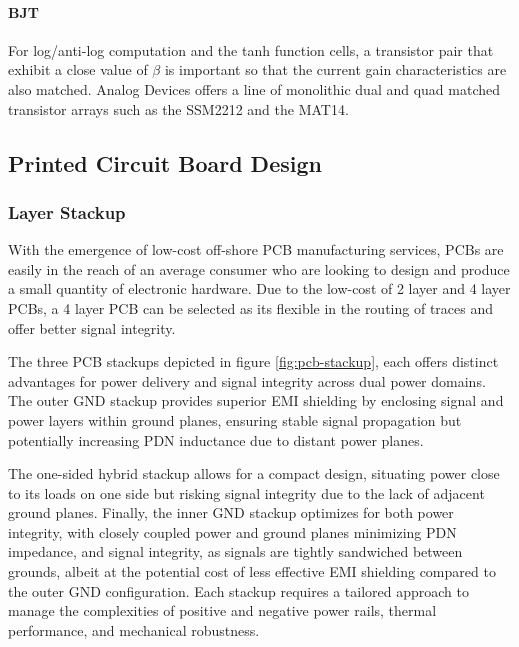 \documentclass[10pt]{article}
\begin{document}
\begin{multicols*}{2}
                \paragraph{BJT}
                    For log/anti-log computation and the tanh function cells, a transistor pair that exhibit a close value of $\beta$ is important so that the current gain characteristics are also matched. Analog Devices offers a line of monolithic dual and quad matched transistor arrays such as the SSM2212 and the MAT14.

            

            \subsection{Printed Circuit Board Design}

                \subsubsection{Layer Stackup}
                    With the emergence of low-cost off-shore PCB manufacturing services, PCBs are easily in the reach of an average consumer who are looking to design and produce a small quantity of electronic hardware. Due to the low-cost of 2 layer and 4 layer PCBs, a 4 layer PCB can be selected as its flexible in the routing of traces and offer better signal integrity.\par
                    The three PCB stackups depicted in figure \ref{fig:pcb-stackup}, each offers distinct advantages for power delivery and signal integrity across dual power domains. The outer GND stackup provides superior EMI shielding by enclosing signal and power layers within ground planes, ensuring stable signal propagation but potentially increasing PDN inductance due to distant power planes.\par
                    The one-sided hybrid stackup allows for a compact design, situating power close to its loads on one side but risking signal integrity due to the lack of adjacent ground planes. Finally, the inner GND stackup optimizes for both power integrity, with closely coupled power and ground planes minimizing PDN impedance, and signal integrity, as signals are tightly sandwiched between grounds, albeit at the potential cost of less effective EMI shielding compared to the outer GND configuration. Each stackup requires a tailored approach to manage the complexities of positive and negative power rails, thermal performance, and mechanical robustness.


\end{multicols*}
\end{document}
